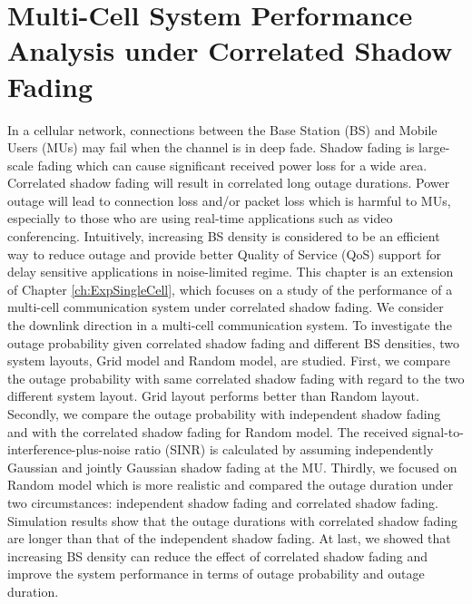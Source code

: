 \chapter{Multi-Cell System Performance Analysis under Correlated Shadow Fading}\label{ch:Multi}
\par In a cellular network, connections between the Base Station (BS) and Mobile Users (MUs) may fail when the channel is in deep fade. Shadow fading is large-scale fading which can cause significant received power loss for a wide area. Correlated shadow fading will result in correlated long outage durations. Power outage will lead to connection loss and/or packet loss which is harmful to MUs, especially to those who are using real-time applications such as video conferencing. Intuitively, increasing BS density is considered to be an efficient way to reduce outage and provide better Quality of Service (QoS) support for delay sensitive applications in noise-limited regime. This chapter is an extension of Chapter \ref{ch:ExpSingleCell}, which focuses on a study of the performance of a multi-cell communication system under correlated shadow fading. We consider the downlink direction in a multi-cell communication system. To investigate the outage probability given correlated shadow fading and different BS densities, two system layouts, Grid model and Random model, are studied. First, we compare the outage probability with same correlated shadow fading with regard to the two different system layout. Grid layout performs better than Random layout. Secondly, we compare the outage probability with independent shadow fading and with the correlated shadow fading for Random model. The received signal-to-interference-plus-noise ratio (SINR) is calculated by assuming independently Gaussian and jointly Gaussian shadow fading at the MU. Thirdly, we focused on Random model which is more realistic and compared the outage duration under two circumstances: independent shadow fading and correlated shadow fading. Simulation results show that the outage durations with correlated shadow fading are longer than that of the independent shadow fading. At last, we showed that increasing BS density can reduce the effect of correlated shadow fading and improve the system performance in terms of outage probability and outage duration. 
